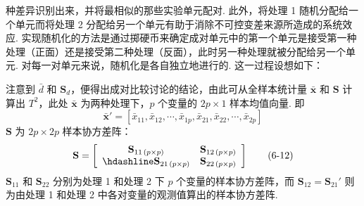 种差异识别出来，并将最相似的那些实验单元配对. 此外，将处理 1 随机分配给一个单元而将处理 2 分配给另一个单元有助于消除不可控变差来源所造成的系统效应. 实现随机化的方法是通过掷硬币来确定成对单元中的第一个单元是接受第一种处理（正面）还是接受第二种处理（反面），此时另一种处理就被分配给另一个单元. 对每一对单元来说，随机化是各自独立地进行的. 这一过程设想如下：

\begin{mvfigure}
\centering
{}
\end{mvfigure}

注意到 $\bar{d}$ 和 $\mathbf{S}_d$，便得出成对比较讨论的结论，由此可从全样本统计量 $\bar{\mathbf{x}}$ 和 $\mathbf{S}$ 计算出 $T^2$，此处 $\bar{\mathbf{x}}$ 为两种处理下，$p$ 个变量的 $2p\times 1$ 样本均值向量. 即
\label{eq:6-11}
\begin{equation}
\bar{\mathbf{x}}'=[\bar{x}_{11},\bar{x}_{12},\cdots,\bar{x}_{1p},\bar{x}_{21},\bar{x}_{22},\cdots,\bar{x}_{2p}] \tag{6-11}
\end{equation}
$\mathbf{S}$ 为 $2p\times 2p$ 样本协方差阵：
\label{eq:6-12}
\begin{equation}
\mathbf{S}=\left[\begin{array}{cc}
\mathbf{S}_{11\,(p\times p)}&\mathbf{S}_{12\,(p\times p)}\\\hdashline
\mathbf{S}_{21\,(p\times p)}&\mathbf{S}_{22\,(p\times p)}
\end{array}\right] \tag{6-12}
\end{equation}
$\mathbf{S}_{11}$ 和 $\mathbf{S}_{22}$ 分别为处理 1 和处理 2 下 $p$ 个变量的样本协方差阵，而 $\mathbf{S}_{12}=\mathbf{S}_{21}'$ 则为由处理 1 和处理 2 中各对变量的观测值算出的样本协方差阵.

